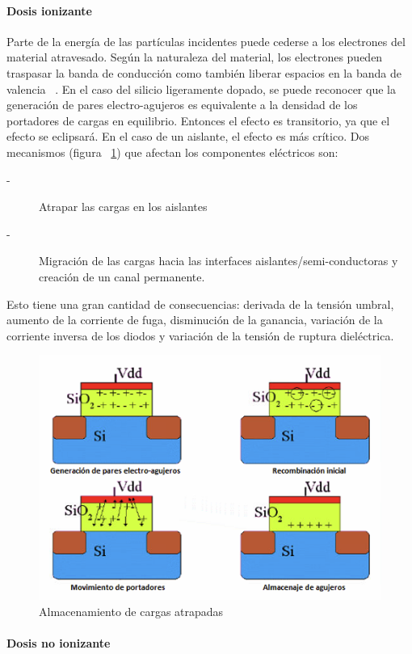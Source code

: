 \paragraph{Dosis ionizante}\hfill \break
 
Parte de la energía de las partículas incidentes puede cederse a los electrones del material atravesado. Según la naturaleza del material, los electrones pueden traspasar la banda de conducción como también liberar espacios en la banda de valencia ~\cite{1208572}. En el caso del silicio ligeramente dopado, se puede reconocer que la generación de pares electro-agujeros es equivalente a la densidad de los portadores de cargas en equilibrio. Entonces el efecto es transitorio, ya que el efecto se eclipsará. En el caso de un aislante, el efecto es más crítico. Dos mecanismos (figura ~\ref{Efectos}) que afectan los componentes eléctricos son:
\begin{description}
\item[-] Atrapar las cargas en los aislantes  
\item[-] Migración de las cargas hacia las interfaces aislantes/semi-conductoras y creación de un canal permanente.

\end{description}
Esto tiene una gran cantidad de consecuencias: derivada de la tensión umbral, aumento de la corriente de fuga, disminución de la ganancia, variación de la corriente inversa de los diodos y variación de la tensión de ruptura dieléctrica.

\begin{figure}[H]
	\centering
	\includegraphics[width=0.8 \textwidth]{img/efectos_cargas.png}
	\caption{Almacenamiento de cargas atrapadas}
	\label{Efectos}
\end{figure}

\paragraph{Dosis no ionizante }\hfill \break

